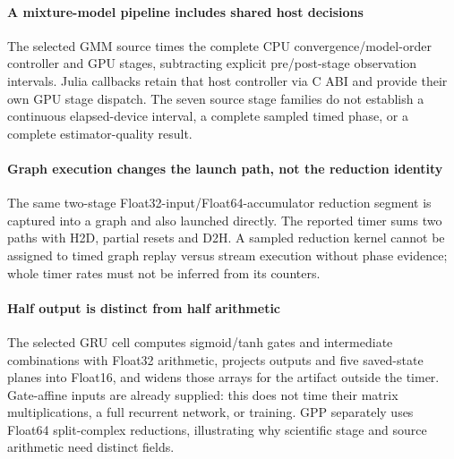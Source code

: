 \paragraph{A mixture-model pipeline includes shared host decisions} The selected GMM source times the complete CPU convergence/model-order controller and GPU stages, subtracting explicit pre/post-stage observation intervals. Julia callbacks retain that host controller via C ABI and provide their own GPU stage dispatch. The seven source stage families do not establish a continuous elapsed-device interval, a complete sampled timed phase, or a complete estimator-quality result.

\paragraph{Graph execution changes the launch path, not the reduction identity} The same two-stage Float32-input/Float64-accumulator reduction segment is captured into a graph and also launched directly. The reported timer sums two paths with H2D, partial resets and D2H. A sampled reduction kernel cannot be assigned to timed graph replay versus stream execution without phase evidence; whole timer rates must not be inferred from its counters.

\paragraph{Half output is distinct from half arithmetic} The selected GRU cell computes sigmoid/tanh gates and intermediate combinations with Float32 arithmetic, projects outputs and five saved-state planes into Float16, and widens those arrays for the artifact outside the timer. Gate-affine inputs are already supplied: this does not time their matrix multiplications, a full recurrent network, or training. GPP separately uses Float64 split-complex reductions, illustrating why scientific stage and source arithmetic need distinct fields.
